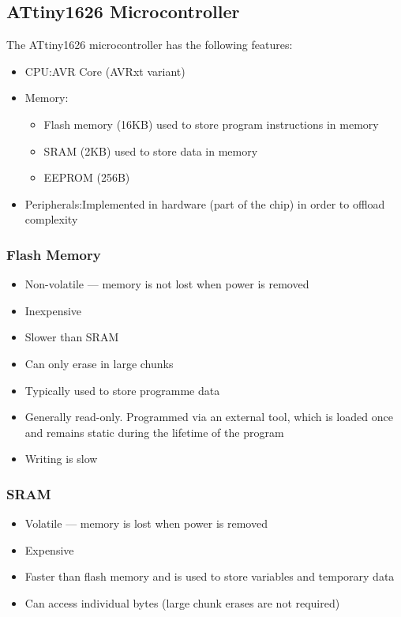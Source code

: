 \documentclass{article}
\begin{document}
\subsection{ATtiny1626 Microcontroller}
The ATtiny1626 microcontroller has the following features:
\begin{itemize}
    \item CPU:\@ AVR Core (AVRxt variant)
    \item Memory:\@
          \begin{itemize}
              \item Flash memory (16KB) used to store program instructions in memory
              \item SRAM (2KB) used to store data in memory
              \item EEPROM (256B)
          \end{itemize}
    \item Peripherals:\@ Implemented in hardware (part of the chip) in order to offload complexity
\end{itemize}
\subsubsection{Flash Memory}
\begin{itemize}
    \item Non-volatile --- memory is not lost when power is removed
    \item Inexpensive
    \item Slower than SRAM
    \item Can only erase in large chunks
    \item Typically used to store programme data
    \item Generally read-only. Programmed via an external tool, which is loaded once and remains static during the lifetime of the program
    \item Writing is slow
\end{itemize}
\subsubsection{SRAM}
\begin{itemize}
    \item Volatile --- memory is lost when power is removed
    \item Expensive
    \item Faster than flash memory and is used to store variables and temporary data
    \item Can access individual bytes (large chunk erases are not required)
\end{itemize}
\end{document}
